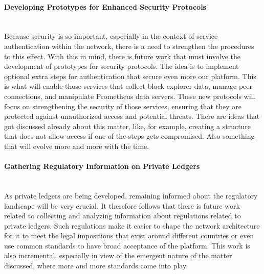 \paragraph{Developing Prototypes for Enhanced Security Protocols}\mbox{}\\
Because security is so important, especially in the context of service authentication within the network, there is a need to strengthen the procedures to this effect. With this in mind, there is future work that must involve the development of prototypes for security protocols. The idea is to implement optional extra steps for authentication that secure even more our platform. This is what will enable those services that collect block explorer data, manage peer connections, and manipulate Prometheus data servers. These new protocols will focus on strengthening the security of those services, ensuring that they are protected against unauthorized access and potential threats. There are ideas that got discussed already about this matter, like, for example, creating a structure that does not allow access if one of the steps gets compromised. Also something that will evolve more and more with the time.

\paragraph{Gathering Regulatory Information on Private Ledgers}\mbox{}\\
As private ledgers are being developed, remaining informed about the regulatory landscape will be very crucial. It therefore follows that there is future work related to collecting and analyzing information about regulations related to private ledgers. Such regulations make it easier to shape the network architecture for it to meet the legal impositions that exist around different countries or even use common standards to have broad acceptance of the platform. This work is also incremental, especially in view of the emergent nature of the matter discussed, where more and more standards come into play.